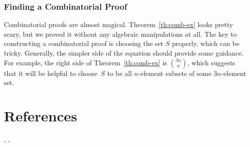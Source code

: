 \subsubsection{Finding a Combinatorial Proof}

Combinatorial proofs are almost magical.  Theorem~\ref{th:comb-ex}
looks pretty scary, but we proved it without any algebraic
manipulations at all.  The key to constructing a combinatorial proof
is choosing the set $S$ properly, which can be tricky.  Generally, the
simpler side of the equation should provide some guidance.  For
example, the right side of Theorem~\ref{th:comb-ex} is
$\binom{3n}{n}$, which suggests that it will be helpful to choose~$S$
to be all $n$-element subsets of some $3n$-element set.

\begin{problems}
\classproblems
{}

\homeworkproblems
{}

\end{problems}

\section{References}

\cite{BenjaminQ2003},
\cite{MR2359513},
\cite{Even1973}

\endinput
